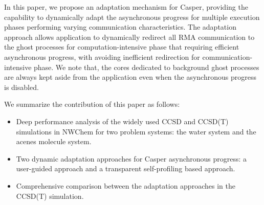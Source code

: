 In this paper, we propose an adaptation mechanism for Casper, providing
the capability to dynamically adapt the asynchronous progress
for multiple execution phases performing varying communication characteristics.
The adaptation approach allows application to dynamically redirect all
RMA communication to the ghost processes for computation-intensive phase
that requiring efficient asynchronous progress, with avoiding inefficient
redirection for communication-intensive phase.
We note that, the cores dedicated to background ghost processes are always
kept aside from the application even when the asynchronous progress is disabled.


We summarize the contribution of this paper as follows:
\begin{itemize}
\item Deep performance analysis of the widely used CCSD and CCSD(T)
simulations in NWChem for two problem systems: the water system and
the acenes molecule system.

\item Two dynamic adaptation approaches for Casper asynchronous
progress: a user-guided approach and a transparent self-profiling
based approach.

\item Comprehensive comparison between the adaptation approaches in
the CCSD(T) simulation.
\end{itemize}

